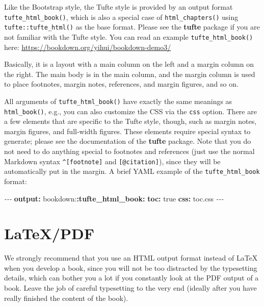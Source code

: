 \documentclass[
  12pt,
]{krantz}
\newenvironment{Shaded}{\begin{snugshade}}{\end{snugshade}}
\newcommand{\AttributeTok}[1]{\textcolor[rgb]{0.13,0.29,0.53}{#1}}
\newcommand{\CharTok}[1]{\textcolor[rgb]{0.31,0.60,0.02}{#1}}
\newcommand{\FunctionTok}[1]{\textcolor[rgb]{0.13,0.29,0.53}{\textbf{#1}}}
\newcommand{\KeywordTok}[1]{\textcolor[rgb]{0.13,0.29,0.53}{\textbf{#1}}}
\newcommand{\PreprocessorTok}[1]{\textcolor[rgb]{0.56,0.35,0.01}{\textit{#1}}}
\theoremstyle{definition}
\theoremstyle{definition}
\theoremstyle{definition}
\theoremstyle{definition}
\theoremstyle{remark}
\begin{document}
Like the Bootstrap style, the Tufte style is provided by an output format \texttt{tufte\_html\_book()}, which is also a special case of \texttt{html\_chapters()} using \texttt{tufte::tufte\_html()} as the base format. Please see the \textbf{tufte} package \citep{R-tufte} if you are not familiar with the Tufte style. You can read an example \texttt{tufte\_html\_book()} here: \url{https://bookdown.org/yihui/bookdown-demo3/}

Basically, it is a layout with a main column on the left and a margin column on the right. The main body is in the main column, and the margin column is used to place footnotes, margin notes, references, and margin figures, and so on.

All arguments of \texttt{tufte\_html\_book()} have exactly the same meanings as \texttt{html\_book()}, e.g., you can also customize the CSS via the \texttt{css} option. There are a few elements that are specific to the Tufte style, though, such as margin notes, margin figures, and full-width figures. These elements require special syntax to generate; please see the documentation of the \textbf{tufte} package. Note that you do not need to do anything special to footnotes and references (just use the normal Markdown syntax \texttt{\^{}{[}footnote{]}} and \texttt{{[}@citation{]}}), since they will be automatically put in the margin. A brief YAML example of the \texttt{tufte\_html\_book} format:

\begin{Shaded}
\begin{Highlighting}[]
\PreprocessorTok{{-}{-}{-}}
\FunctionTok{output}\KeywordTok{:}
\AttributeTok{  bookdown:}\FunctionTok{:tufte\_html\_book}\KeywordTok{:}
\AttributeTok{    }\FunctionTok{toc}\KeywordTok{:}\AttributeTok{ }\CharTok{true}
\AttributeTok{    }\FunctionTok{css}\KeywordTok{:}\AttributeTok{ toc.css}
\PreprocessorTok{{-}{-}{-}}
\end{Highlighting}
\end{Shaded}

\section{LaTeX/PDF}\label{latexpdf}

We strongly recommend that you use an HTML output format instead of LaTeX when you develop a book, since you will not be too distracted by the typesetting details, which can bother you a lot if you constantly look at the PDF output of a book. Leave the job of careful typesetting to the very end (ideally after you have really finished the content of the book).
\end{document}
